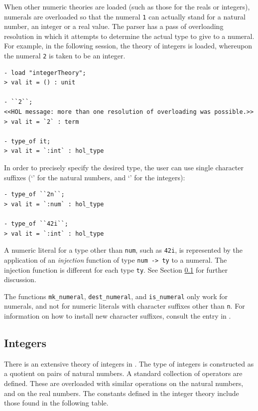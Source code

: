 When other numeric theories are loaded (such as those for the reals or
integers), numerals are overloaded so that the numeral {\small\verb+1+} can
actually stand for a natural number, an integer or a real value. The
parser has a pass of overloading resolution in which it attempts to
determine the actual type to give to a numeral. For example, in the
following session, the theory of integers is loaded, whereupon the
numeral \verb+2+ is taken to be an integer.
%
\begin{session}
\begin{verbatim}
- load "integerTheory";
> val it = () : unit

- ``2``;
<<HOL message: more than one resolution of overloading was possible.>>
> val it = `2` : term

- type_of it;
> val it = `:int` : hol_type
\end{verbatim}
\end{session}

 In order to precisely specify the desired type, the user can use single
character suffixes (`' for the natural numbers, and `' for
the integers):
\begin{session}
\begin{verbatim}
- type_of ``2n``;
> val it = `:num` : hol_type

- type_of ``42i``;
> val it = `:int` : hol_type
\end{verbatim}
\end{session}

A numeric literal for a \HOL{} type other than \verb+num+, such as
\verb+42i+,  is represented by the application of an
\emph{injection} function of type {\small\verb+num -> ty+} to a
numeral. The injection function is different for each type
{\small\verb+ty+}. See Section \ref{integers} for further discussion.

The functions {\verb+mk_numeral+}, {\verb+dest_numeral+}, and
{\verb+is_numeral+} only work for numerals, and not for numeric
literals with character suffixes other than {\small\verb+n+}. For
information on how to install new character suffixes, consult the
 entry in \REFERENCE.

\subsection{Integers}
\label{integers}

There is an extensive theory of integers in \HOL. The type of integers
is constructed as a quotient on pairs of natural numbers. A standard
collection of operators are defined. These are overloaded with
similar operations on the natural numbers, and on the real numbers.
The constants defined in the integer theory include those found in the
following table.

